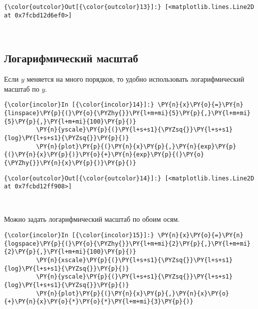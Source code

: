             \begin{Verbatim}[commandchars=\\\{\}]
{\color{outcolor}Out[{\color{outcolor}13}]:} [<matplotlib.lines.Line2D at 0x7fcbd12d6ef0>]
\end{Verbatim}
        
    \begin{center}
    \end{center}
    { \hspace*{\fill} \\}
    
\subsection{Логарифмический масштаб}
\label{matplotlib2}

Если \(y\) меняется на много порядков, то удобно использовать
логарифмический масштаб по \(y\).

    \begin{Verbatim}[commandchars=\\\{\}]
{\color{incolor}In [{\color{incolor}14}]:} \PY{n}{x}\PY{o}{=}\PY{n}{linspace}\PY{p}{(}\PY{o}{\PYZhy{}}\PY{l+m+mi}{5}\PY{p}{,}\PY{l+m+mi}{5}\PY{p}{,}\PY{l+m+mi}{100}\PY{p}{)}
         \PY{n}{yscale}\PY{p}{(}\PY{l+s+s1}{\PYZsq{}}\PY{l+s+s1}{log}\PY{l+s+s1}{\PYZsq{}}\PY{p}{)}
         \PY{n}{plot}\PY{p}{(}\PY{n}{x}\PY{p}{,}\PY{n}{exp}\PY{p}{(}\PY{n}{x}\PY{p}{)}\PY{o}{+}\PY{n}{exp}\PY{p}{(}\PY{o}{\PYZhy{}}\PY{n}{x}\PY{p}{)}\PY{p}{)}
\end{Verbatim}

            \begin{Verbatim}[commandchars=\\\{\}]
{\color{outcolor}Out[{\color{outcolor}14}]:} [<matplotlib.lines.Line2D at 0x7fcbd12ff908>]
\end{Verbatim}
        
    \begin{center}
    \end{center}
    { \hspace*{\fill} \\}
    
    Можно задать логарифмический масштаб по обоим осям.

    \begin{Verbatim}[commandchars=\\\{\}]
{\color{incolor}In [{\color{incolor}15}]:} \PY{n}{x}\PY{o}{=}\PY{n}{logspace}\PY{p}{(}\PY{o}{\PYZhy{}}\PY{l+m+mi}{2}\PY{p}{,}\PY{l+m+mi}{2}\PY{p}{,}\PY{l+m+mi}{100}\PY{p}{)}
         \PY{n}{xscale}\PY{p}{(}\PY{l+s+s1}{\PYZsq{}}\PY{l+s+s1}{log}\PY{l+s+s1}{\PYZsq{}}\PY{p}{)}
         \PY{n}{yscale}\PY{p}{(}\PY{l+s+s1}{\PYZsq{}}\PY{l+s+s1}{log}\PY{l+s+s1}{\PYZsq{}}\PY{p}{)}
         \PY{n}{plot}\PY{p}{(}\PY{n}{x}\PY{p}{,}\PY{n}{x}\PY{o}{+}\PY{n}{x}\PY{o}{*}\PY{o}{*}\PY{l+m+mi}{3}\PY{p}{)}
\end{Verbatim}

